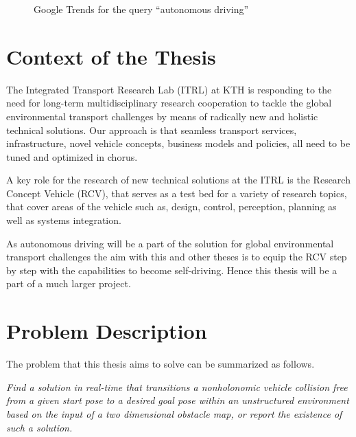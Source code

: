 \begin{figure}[h]
\caption{Google Trends for the query ``autonomous driving''}
\label{fig:googleTrends}
\end{figure}

\section{Context of the Thesis}
The Integrated Transport Research Lab (ITRL) at KTH is responding to the need for long-term multidisciplinary research cooperation to tackle the global environmental transport challenges by means of radically new and holistic technical solutions. Our approach is that seamless transport services, infrastructure, novel vehicle concepts, business models and policies, all need to be tuned and optimized in chorus.

A key role for the research of new technical solutions at the ITRL is the Research Concept Vehicle (RCV), that serves as a test bed for a variety of research topics, that cover areas of the vehicle such as, design, control, perception, planning as well as systems integration.

As autonomous driving will be a part of the solution for global environmental transport challenges the aim with this and other theses is to equip the RCV step by step with the capabilities to become self-driving. Hence this thesis will be a part of a much larger project.

\section{Problem Description} \label{sec:problemDescription}
The problem that this thesis aims to solve can be summarized as follows.

\emph{Find a solution in real-time that transitions a nonholonomic vehicle collision free from a given start pose to a desired goal pose within an unstructured environment based on the input of a two dimensional obstacle map, or report the existence of such a solution.}

